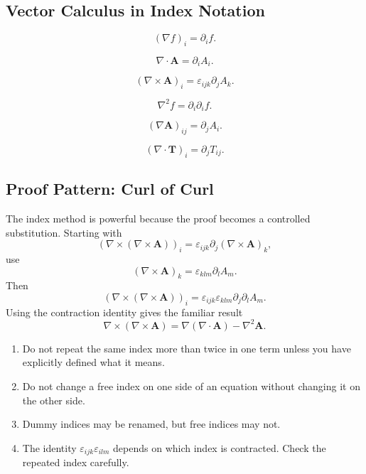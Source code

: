 \documentclass{otscience}
\begin{document}
\subsection{Vector Calculus in Index Notation}

\begin{formulabox}
    \[
        {(\nabla f)}_i=\partial_i f.
    \]

    \[
        \nabla\cdot\mathbf{A}=\partial_{i}A_i.
    \]

    \[
        {(\nabla\times\mathbf{A})}_i=\varepsilon_{ijk}\partial_{j}A_k.
    \]

    \[
        \nabla^2 f=\partial_i\partial_i f.
    \]

    \[
        {(\nabla\mathbf{A})}_{ij}=\partial_{j}A_i.
    \]

    \[
        {(\nabla\cdot\mathbf{T})}_i=\partial_{j}T_{ij}.
    \]
\end{formulabox}

\subsection{Proof Pattern: Curl of Curl}

The index method is powerful because the proof becomes a controlled substitution. Starting with
\[
    {(\nabla\times(\nabla\times\mathbf{A}))}_i=\varepsilon_{ijk}\partial_j{(\nabla\times\mathbf{A})}_k,
\]
use
\[
    {(\nabla\times\mathbf{A})}_k=\varepsilon_{klm}\partial_{l}A_m.
\]
Then
\[
    {(\nabla\times(\nabla\times\mathbf{A}))}_i=\varepsilon_{ijk}\varepsilon_{klm}\partial_j\partial_{l}A_m.
\]
Using the contraction identity gives the familiar result
\[
    \nabla\times(\nabla\times\mathbf{A})=\nabla(\nabla\cdot\mathbf{A})-\nabla^2\mathbf{A}.
\]

\begin{warningboxnosplit}
    \begin{enumerate}
        \item Do not repeat the same index more than twice in one term unless you have explicitly defined what it means.
        \item Do not change a free index on one side of an equation without changing it on the other side.
        \item Dummy indices may be renamed, but free indices may not.
        \item The identity \(\varepsilon_{ijk}\varepsilon_{ilm}\) depends on which index is contracted. Check the repeated index carefully.
    \end{enumerate}
\end{warningboxnosplit}
\end{document}
